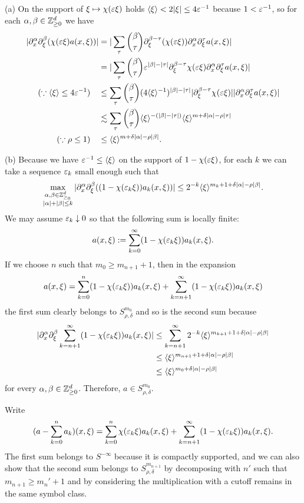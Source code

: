 \documentclass{../../large}
\begin{document}
\begin{pf}
(a)
On the support of $\xi\mapsto\chi(\varepsilon\xi)$ holds $\langle\xi\rangle<2|\xi|\le4\varepsilon^{-1}$ because $1<\varepsilon^{-1}$, so for each $\alpha,\beta\in\mathbb{Z}_{\ge0}^d$ we have
\begin{align*}
|\partial_x^\alpha\partial_\xi^\beta(\chi(\varepsilon\xi)a(x,\xi))|
&=|\sum_\tau{\beta\choose\tau}\partial_\xi^{\beta-\tau}(\chi(\varepsilon\xi))\partial_x^\alpha\partial_\xi^\tau a(x,\xi)|\\
&=|\sum_\tau{\beta\choose\tau}\varepsilon^{|\beta|-|\tau|}\partial_\xi^{\beta-\tau}\chi(\varepsilon\xi)\partial_x^\alpha\partial_\xi^\tau a(x,\xi)|\\
(\because\langle\xi\rangle\le4\varepsilon^{-1})\quad
&\le\sum_\tau{\beta\choose\tau}(4\langle\xi\rangle^{-1})^{|\beta|-|\tau|}|\partial_\xi^{\beta-\tau}\chi(\varepsilon\xi)||\partial_x^\alpha\partial_\xi^\tau a(x,\xi)|\\
&\lesssim\sum_{\tau}{\beta\choose\tau}\langle\xi\rangle^{-(|\beta|-|\tau|)}\langle\xi\rangle^{m+\delta|\alpha|-\rho|\tau|}\\
(\because\rho\le1)\quad
&\le\langle\xi\rangle^{m+\delta|\alpha|-\rho|\beta|}.
\end{align*}

(b)
Because we have $\varepsilon^{-1}\le\langle\xi\rangle$ on the support of $1-\chi(\varepsilon\xi)$, for each $k$ we can take a sequence $\varepsilon_k$ small enough such that
\[\max_{\substack{\alpha,\beta\in\mathbb{Z}_{\ge_0}^d\\|\alpha|+|\beta|\le k}}|\partial_x^\alpha\partial_\xi^\beta((1-\chi(\varepsilon_k\xi))a_k(x,\xi))|\le2^{-k}\langle\xi\rangle^{m_k+1+\delta|\alpha|-\rho|\beta|}.\]
We may assume $\varepsilon_k\downarrow0$ so that the following sum is locally finite:
\[a(x,\xi):=\sum_{k=0}^\infty(1-\chi(\varepsilon_k\xi))a_k(x,\xi).\]
If we choose $n$ such that $m_0\ge m_{n+1}+1$, then in the expansion
\[a(x,\xi)=\sum_{k=0}^n(1-\chi(\varepsilon_k\xi))a_k(x,\xi)+\sum_{k=n+1}^\infty(1-\chi(\varepsilon_k\xi))a_k(x,\xi)\]
the first sum clearly belongs to $S_{\rho,\delta}^{m_0}$ and so is the second sum because
\begin{align*}
|\partial_x^\alpha\partial_\xi^\beta\sum_{k=n+1}^\infty(1-\chi(\varepsilon_k\xi))a_k(x,\xi)|
&\le\sum_{k=n+1}^\infty2^{-k}\langle\xi\rangle^{m_{k+1}+1+\delta|\alpha|-\rho|\beta|}\\
&\le\langle\xi\rangle^{m_{n+1}+1+\delta|\alpha|-\rho|\beta|}\\
&\le\langle\xi\rangle^{m_0+\delta|\alpha|-\rho|\beta|}
\end{align*}
for every $\alpha,\beta\in\mathbb{Z}_{\ge0}^d$.
Therefore, $a\in S_{\rho,\delta}^{m_0}$.

Write
\[(a-\sum_{k=0}^na_k)(x,\xi)=\sum_{k=0}^n\chi(\varepsilon_k\xi)a_k(x,\xi)+\sum_{k=n+1}^\infty(1-\chi(\varepsilon_k\xi))a_k(x,\xi).\]
The first sum belongs to $S^{-\infty}$ because it is compactly supported, and we can also show that the second sum belongs to $S_{\rho,\delta}^{m_{n+1}}$ by decomposing with $n'$ such that $m_{n+1}\ge m_n'+1$ and by considering the multiplication with a cutoff remains in the same symbol class.
\end{pf}
\end{document}
